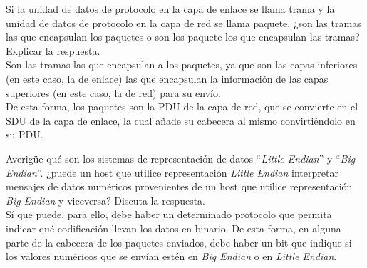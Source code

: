 \begin{ejercicio}
   Si la unidad de datos de protocolo en la capa de enlace se llama trama y la unidad de datos de protocolo en la capa de red se llama paquete, ¿son las tramas las que encapsulan los paquetes o son los paquete los que encapsulan las tramas? Explicar la respuesta. \\
   
   Son las tramas las que encapsulan a los paquetes, ya que son las capas inferiores (en este caso, la de enlace) las que encapsulan la información de las capas superiores (en este caso, la de red) para su envío.\\

   De esta forma, los paquetes son la PDU de la capa de red, que se convierte en el SDU de la capa de enlace, la cual añade su cabecera al mismo convirtiéndolo en su PDU\@.
\end{ejercicio}

\begin{ejercicio}
    Averigüe qué son los sistemas de representación de datos ``\textit{Little Endian}'' y ``\textit{Big Endian}''. ¿puede un host que utilice representación \textit{Little Endian} interpretar mensajes de datos numéricos provenientes de un host que utilice representación \textit{Big Endian} y viceversa? Discuta la respuesta.\\

    Sí que puede, para ello, debe haber un determinado protocolo que permita indicar qué codificación llevan los datos en binario. De esta forma, en alguna parte de la cabecera de los paquetes enviados, debe haber un bit que indique si los valores numéricos que se envían estén en \textit{Big Endian} o en \textit{Little Endian}.
\end{ejercicio}

